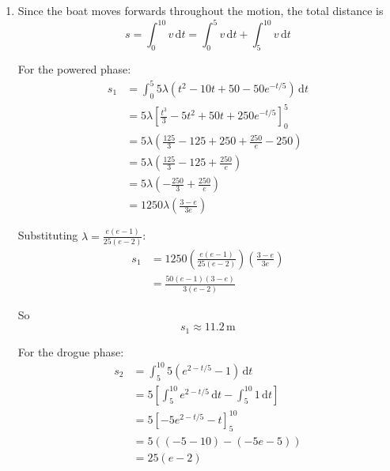 \documentclass[leqno]{article}
\begin{document}
\begin{enumerate}[
  label=\textbf{\arabic*.},
  leftmargin=*,
  topsep=0pt,
  partopsep=0pt,
  parsep=0pt
]
\begin{djsSolution}
\begin{enumerate}[label=\textbf{(\alph*)}]
\begin{enumerate}[label=(\roman*)]
    From part (c)(ii):
    \[
    v(5)=5(e-1)
    \]

    Equating these:
    \begin{align*}
    5\lambda\left(25-\frac{50}{e}\right)&=5(e-1) \\
    \lambda\left(25-\frac{50}{e}\right)&=e-1 \\
    \lambda\left(\frac{25e-50}{e}\right)&=e-1 \\
    \lambda\left(\frac{25(e-2)}{e}\right)&=e-1
    \end{align*}

    So
    \[
    \lambda=\frac{e(e-1)}{25(e-2)}
    \]

    Therefore
    \[
    \lambda=\frac{e(e-1)}{25(e-2)}\approx 0.260
    \]
  \end{enumerate}

  \item Since the boat moves forwards throughout the motion, the total distance is
  \[
  s=\int_0^{10} v\,\mathrm{d}t=\int_0^5 v\,\mathrm{d}t+\int_5^{10} v\,\mathrm{d}t
  \]

  For the powered phase:
  \begin{align*}
  s_1&=\int_0^5 5\lambda\left(t^2-10t+50-50e^{-t/5}\right)\,\mathrm{d}t \\
  &=5\lambda\left[\frac{t^3}{3}-5t^2+50t+250e^{-t/5}\right]_0^5 \\
  &=5\lambda\left(\frac{125}{3}-125+250+\frac{250}{e}-250\right) \\
  &=5\lambda\left(\frac{125}{3}-125+\frac{250}{e}\right) \\
  &=5\lambda\left(-\frac{250}{3}+\frac{250}{e}\right) \\
  &=1250\lambda\left(\frac{3-e}{3e}\right)
  \end{align*}

  Substituting $\lambda=\frac{e(e-1)}{25(e-2)}$:
  \begin{align*}
  s_1&=1250\left(\frac{e(e-1)}{25(e-2)}\right)\left(\frac{3-e}{3e}\right) \\
  &=\frac{50(e-1)(3-e)}{3(e-2)}
  \end{align*}

  So
  \[
  s_1\approx 11.2\,\mathrm{m}
  \]

  For the drogue phase:
  \begin{align*}
  s_2&=\int_5^{10} 5\left(e^{2-t/5}-1\right)\,\mathrm{d}t \\
  &=5\left[\int_5^{10} e^{2-t/5}\,\mathrm{d}t-\int_5^{10} 1\,\mathrm{d}t\right] \\
  &=5\left[-5e^{2-t/5}-t\right]_5^{10} \\
  &=5\left((-5-10)-(-5e-5)\right) \\
  &=25(e-2)
  \end{align*}


\end{enumerate}
\end{djsSolution}
\end{enumerate}
\end{document}
